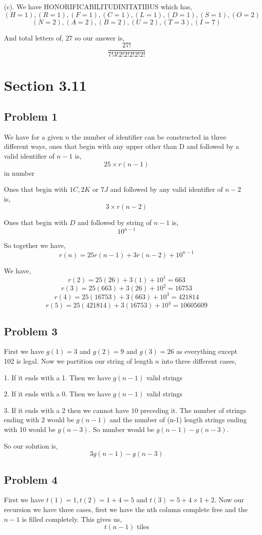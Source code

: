 \documentclass[a4paper]{report}
\begin{document}
(c). We have HONORIFICABILITUDINITATIBUS which has, 
$$(H= 1), (R= 1), (F= 1), (C= 1), (L= 1), (D= 1), (S= 1), (O= 2)$$ $$ (N= 2), (A= 2), (B= 2), (U= 2), (T= 3), (I= 7)$$

And total letters of, 27 so our answer is, 
$$ \frac{27!}{7!3!2!2!2!2!2!} $$ 


\section*{Section 3.11}
\subsection*{Problem 1}
We have for a given $n$ the number of identifier can be constructed in three different ways, ones that begin with any upper other than D and followed by a valid identifier of $n - 1$ is, 
$$ 25 \times r(n-1)  $$  in number

Ones that begin with $1C,2K$ or  $7J$ and followed by any valid  identifier of $n - 2$ is, 
$$ 3 \times  r(n - 2) $$ 

Ones that begin with $D$ and followed by string  of $n - 1$ is, 
$$ 10^{n-1} $$ 

So together we have, 
$$ r(n) = 25  r(n-1)  + 3   r(n- 2)  + 10^{n- 1}$$ 

We have, 
$$ r(2) = 25(26) + 3(1) + 10^{1} =  663$$ 
$$ r(3) = 25(663)  + 3(26) + 10^{2} = 16753$$  
$$ r(4) = 25(16753)  + 3(663) + 10^{3} = 421814$$  
$$ r(5) = 25(421814)  + 3(16753) + 10^{4} = 10605609$$  


\subsection*{Problem 3}
First we have $g(1) = 3$ and  $g(2) = 9 $ and $g(3) = 26$ as everything except 102 is legal. Now we partition our string of length  $n$ into three different cases,

1. If it ends with a 1. Then we have $g(n - 1)$ valid strings

2. If it ends with a 0. Then we have $g(n - 1)$ valid strings

3. If it ends with a $2$ then we cannot have $10$ preceding it. The number of strings ending with $2$ would be $g(n -1)$ and the number of (n-1) length strings ending with 10 would be $g(n - 3)$. So number would be $g(n - 1) - g(n - 3)$.

So  our solution is, 
$$ 3g(n - 1) - g(n - 3) $$ 

\subsection*{Problem 4}
First we have $t(1) = 1, t(2) = 1 + 4 = 5$ and  $t(3) = 5 + 4 \times 1 + 2$. Now our recursion we have three cases, first we have the nth column complete free and the $n - 1$ is filled completely. This gives us, 
$$ t(n - 1)  \text{ tiles}$$ 
\end{document}
